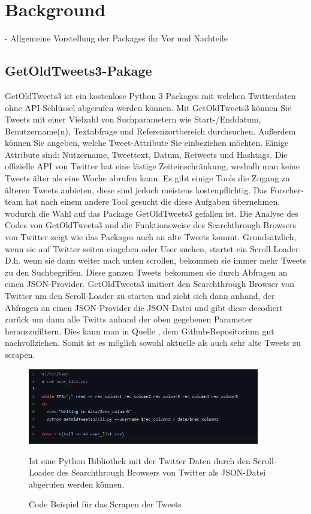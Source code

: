 \section{Background}


	- Allgemeine Vorstellung der Packages ihr Vor und Nachteile
	
	\subsection{GetOldTweets3-Pakage}
	
	GetOldTweets3 ist ein kostenlose Python 3 Packages mit welchen Twitterdaten ohne API-Schlüssel abgerufen werden können.
	Mit GetOldTweets3 können Sie Tweets mit einer Vielzahl von Suchparametern wie Start-/Enddatum, Benutzername(n), Textabfrage 
	und Referenzortbereich durchsuchen. Außerdem können Sie angeben, welche Tweet-Attribute Sie einbeziehen möchten. Einige Attribute
	sind: Nutzername, Tweettext, Datum, Retweets und Hashtags. 
	Die offizielle API von Twitter hat eine lästige Zeiteinschränkung, weshalb man keine Tweets älter als eine Woche abrufen 
	kann. Es gibt einige Tools die Zugang zu älteren Tweets anbieten, diese sind jedoch meistens kostenpflichtig. Das Forscher-
	team hat nach einem andere Tool gesucht die diese Aufgaben übernehmen, wodurch die Wahl auf das Package GetOldTweets3 gefallen 
	ist.   	
	Die Analyse des Codes von GetOldTweets3 und die Funktionsweise des Searchthrough Browsers von Twitter zeigt wie das Packages auch
	an alte Tweets kommt. Grundsätzlich, wenn sie auf Twitter seiten eingeben oder User suchen, startet ein Scroll-Loader. D.h. wenn sie
	dann weiter nach unten scrollen, bekommen sie immer mehr Tweets zu den Suchbegriffen. Diese ganzen Tweets bekommen sie durch Abfragen 
	an einen JSON-Provider. GetOldTweets3 imitiert den Searchthrough Browser von Twitter um den Scroll-Loader zu starten und zieht sich dann 
	anhand, der Abfragen an einen JSON-Provider die JSON-Datei und gibt diese decodiert zurück um dann alle Twitts anhand der oben gegebenen 
	Parameter herauszufiltern. Dies kann man in Quelle , dem Github-Repositorium gut nachvollziehen. Somit ist es möglich sowohl 
	aktuelle als auch sehr alte Tweets zu scrapen.
	
	
	\begin{figure}[ht]
		\centering
		\includegraphics[width=0.9\textwidth]{images/Kapitel2/Code_Beispiel_1}
			\caption{\label{fig:CodeBeispiel}Code Beispiel für das Scrapen der Tweets}{Ist eine Python Bibliothek mit der Twitter Daten durch den Scroll-Loader 
			        des Searchthrough Browsers von Twitter als JSON-Datei abgerufen werden können.}
	\end{figure}
	
